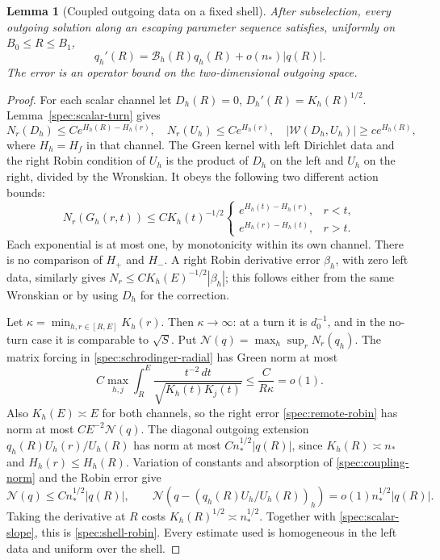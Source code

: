 \documentclass[11pt]{article}
\numberwithin{equation}{section}
\newtheorem{lemma}[theorem]{Lemma}
\theoremstyle{definition}
\theoremstyle{remark}
\begin{document}
\begin{lemma}[Coupled outgoing data on a fixed shell]\label{spec:boundary-estimate}
After subselection, every outgoing solution along an escaping
parameter sequence satisfies, uniformly on $B_0\le R\le B_1$,
\begin{equation}\label{spec:shell-robin}
 q_h'(R)=\mathcal B_h(R)q_h(R)+o(n_*)|q(R)|.
\end{equation}
The error is an operator bound on the two-dimensional outgoing space.
\end{lemma}

\begin{proof}
For each scalar channel let $D_h(R)=0$, $D_h'(R)=K_h(R)^{1/2}$.
Lemma~\ref{spec:scalar-turn} gives
\[
 N_r(D_h)\le Ce^{H_h(R)-H_h(r)},\quad
 N_r(U_h)\le Ce^{H_h(r)},\quad
 |\mathcal W(D_h,U_h)|\ge ce^{H_h(R)},
\]
where $H_h=H_f$ in that channel. The Green kernel with left
Dirichlet data and the right Robin condition of $U_h$ is the product
of $D_h$ on the left and $U_h$ on the right, divided by the Wronskian.
It obeys the following two different action bounds:
\begin{equation}\label{spec:green-actions}
 N_r(G_h(r,t))\le C K_h(t)^{-1/2}
 \begin{cases}
 e^{H_h(t)-H_h(r)},&r<t,\\
 e^{H_h(r)-H_h(t)},&r>t.
 \end{cases}
\end{equation}
Each exponential is at most one, by monotonicity within its own
channel. There is no comparison of $H_+$ and $H_-$. A right Robin
derivative error $\beta_h$, with zero left data, similarly gives
$N_r\le CK_h(E)^{-1/2}|\beta_h|$; this follows either from the same
Wronskian or by using $D_h$ for the correction.

Let $\kappa=\min_{h,r\in[R,E]}K_h(r)$. Then $\kappa\to\infty$:
at a turn it is $d_0^{-1}$, and in the no-turn case it is comparable
to $\sqrt S$. Put $\mathcal N(q)=\max_h\sup_rN_r(q_h)$.
The matrix forcing in \eqref{spec:schrodinger-radial} has Green norm
at most
\begin{equation}\label{spec:coupling-norm}
 C\max_{h,j}\int_R^E
 \frac{t^{-2}\,dt}{\sqrt{K_h(t)K_j(t)}}
 \le\frac{C}{R\kappa}=o(1).
\end{equation}
Also $K_h(E)\asymp E$ for both channels, so the right error
\eqref{spec:remote-robin} has norm at most $CE^{-2}\mathcal N(q)$.
The diagonal outgoing extension
$q_h(R)U_h(r)/U_h(R)$ has norm at most
$Cn_*^{1/2}|q(R)|$, since $K_h(R)\asymp n_*$ and
$H_h(r)\le H_h(R)$. Variation of constants and absorption of
\eqref{spec:coupling-norm} and the Robin error give
\[
 \mathcal N(q)\le Cn_*^{1/2}|q(R)|,\qquad
 \mathcal N\left(q-\left(q_h(R)U_h/U_h(R)\right)_h\right)
 =o(1)n_*^{1/2}|q(R)|.
\]
Taking the derivative at $R$ costs $K_h(R)^{1/2}\asymp n_*^{1/2}$.
Together with \eqref{spec:scalar-slope}, this is
\eqref{spec:shell-robin}. Every estimate used is homogeneous in the
left data and uniform over the shell.
\end{proof}
\end{document}
